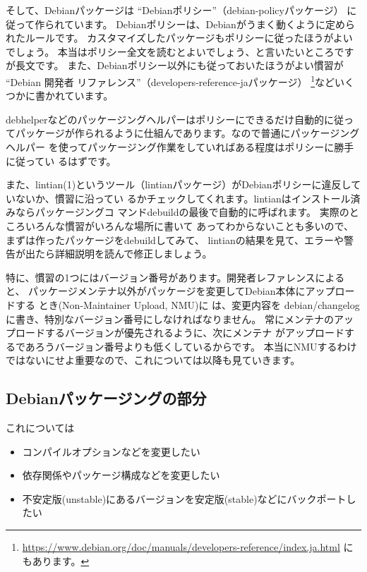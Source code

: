 \documentclass[mingoth,a4paper]{jsarticle}
\begin{document}
そして、Debianパッケージは ``Debianポリシー''（debian-policyパッケージ）
に従って作られています。
Debianポリシーは、Debianがうまく動くように定められたルールです。
カスタマイズしたパッケージもポリシーに従ったほうがよいでしょう。
本当はポリシー全文を読むとよいでしょう、と言いたいところですが長文です。
また、Debianポリシー以外にも従っておいたほうがよい慣習が ``Debian 開発者
リファレンス''（developers-reference-jaパッケージ）
\footnote{\url{https://www.debian.org/doc/manuals/developers-reference/index.ja.html}
にもあります。}などいくつかに書かれています。

debhelperなどのパッケージングヘルパーはポリシーにできるだけ自動的に従っ
てパッケージが作られるように仕組んであります。なので普通にパッケージングヘルパー
を使ってパッケージング作業をしていればある程度はポリシーに勝手に従ってい
るはずです。

また、lintian(1)というツール（lintianパッケージ）がDebianポリシーに違反していないか、慣習に沿ってい
るかチェックしてくれます。lintianはインストール済みならパッケージングコ
マンドdebuildの最後で自動的に呼ばれます。
実際のところいろんな慣習がいろんな場所に書いて
あってわからないことも多いので、まずは作ったパッケージをdebuildしてみて、
lintianの結果を見て、エラーや警告が出たら詳細説明を読んで修正しましょう。

特に、慣習の1つにはバージョン番号があります。開発者レファレンスによると、
パッケージメンテナ以外がパッケージを変更してDebian本体にアップロードする
とき(Non-Maintainer Upload, NMU)に
は、変更内容を debian/changelog に書き、特別なバージョン番号にしなければなりません。
常にメンテナのアップロードするバージョンが優先されるように、次にメンテナ
がアップロードするであろうバージョン番号よりも低くしているからです。
本当にNMUするわけではないにせよ重要なので、これについては以降も見ていきます。

\subsection{Debianパッケージングの部分\label{sec:customize-debpkg}}

これについては

\begin{itemize}
 \item コンパイルオプションなどを変更したい
 \item 依存関係やパッケージ構成などを変更したい
 \item 不安定版(unstable)にあるバージョンを安定版(stable)などにバックポートしたい
\end{itemize}
\end{document}
